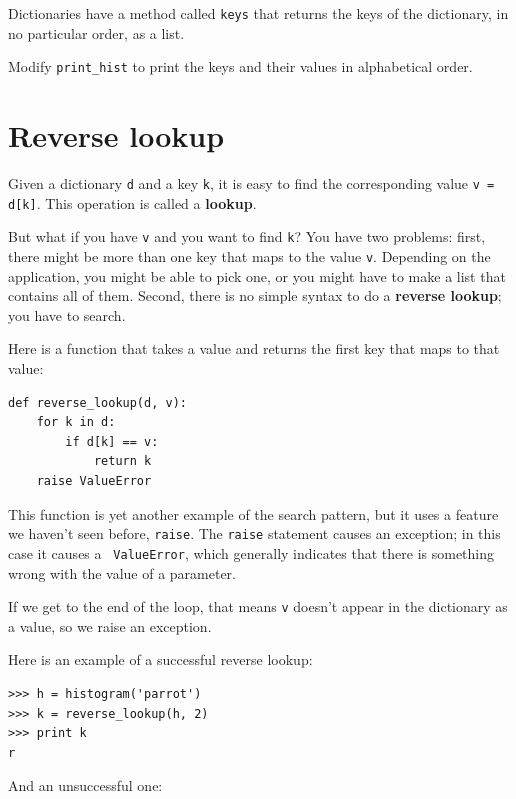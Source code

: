 \documentclass[10pt]{book}
\begin{document}
\begin{CJK}{UTF8}{gbsn}
\begin{exercise}

Dictionaries have a method called {\tt keys} that returns
the keys of the dictionary, in no particular order, as a list.

Modify \verb"print_hist" to print the keys and their values
in alphabetical order.
\end{exercise}



\section{Reverse lookup}
\label{raise}

Given a dictionary {\tt d} and a key {\tt k}, it is easy to
find the corresponding value {\tt v = d[k]}.  This operation
is called a {\bf lookup}.

But what if you have {\tt v} and you want to find {\tt k}?
You have two problems: first, there might be more than one
key that maps to the value {\tt v}.  Depending on the application,
you might be able to pick one, or you might have to make
a list that contains all of them.  Second, there is no
simple syntax to do a {\bf reverse lookup}; you have to search.

Here is a function that takes a value and returns the first
key that maps to that value:

\begin{verbatim}
def reverse_lookup(d, v):
    for k in d:
        if d[k] == v:
            return k
    raise ValueError
\end{verbatim}
%
This function is yet another example of the search pattern, but it
uses a feature we haven't seen before, {\tt raise}.  The {\tt raise}
statement causes an exception; in this case it causes a {\tt
  ValueError}, which generally indicates that there is something wrong
with the value of a parameter.

If we get to the end of the loop, that means {\tt v}
doesn't appear in the dictionary as a value, so we raise an
exception.

Here is an example of a successful reverse lookup:

\begin{verbatim}
>>> h = histogram('parrot')
>>> k = reverse_lookup(h, 2)
>>> print k
r
\end{verbatim}
%
And an unsuccessful one:


\end{CJK}
\end{document}
